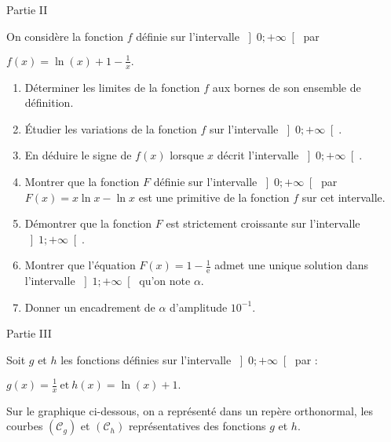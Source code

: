 \begin{h3}Partie II \end{h3}
On considère la fonction $f$ définie sur l'intervalle $\left]0; +\infty \right[$ par
\par
$f\left(x\right)=\ln \left(x\right)+1-\frac{1}{x}.$
\begin{enumerate}
     \item
     Déterminer les limites de la fonction $f$ aux bornes de son ensemble de définition.
     \item
     Étudier les variations de la fonction $f$ sur l'intervalle $\left]0; +\infty \right[$.
     \item
     En déduire le signe de $f\left(x\right)$ lorsque $x$ décrit l'intervalle $\left]0; +\infty \right[$.
     \item
     Montrer que la fonction $F$ définie sur l'intervalle $\left]0; +\infty \right[$ par $F\left(x\right)=x \ln x-\ln x$ est une primitive de la fonction $f$ sur cet intervalle.
     \item
     Démontrer que la fonction $F$ est strictement croissante sur l'intervalle $\left]1; +\infty \right[$.
     \item
     Montrer que l'équation $F\left(x\right)=1-\frac{1}{\text{e}}$ admet une unique solution dans l'intervalle $\left]1;+\infty \right[$ qu'on note $\alpha $.
     \item
     Donner un encadrement de $\alpha $ d'amplitude $10^{-1}$.
\end{enumerate}
\begin{h3} Partie III \end{h3}
Soit $g$ et $h$ les fonctions définies sur l'intervalle $\left]0; +\infty \right[$ par :
\par
$g\left(x\right)=\frac{1}{x}\   \text{et} \   h\left(x\right)=\ln \left(x\right)+1.$
\par
Sur le graphique ci-dessous, on a représenté dans un repère orthonormal, les courbes $\left(\mathscr C_{g}\right)$ et $\left(\mathscr C_{h}\right)$ représentatives des fonctions $g$ et $h$.

